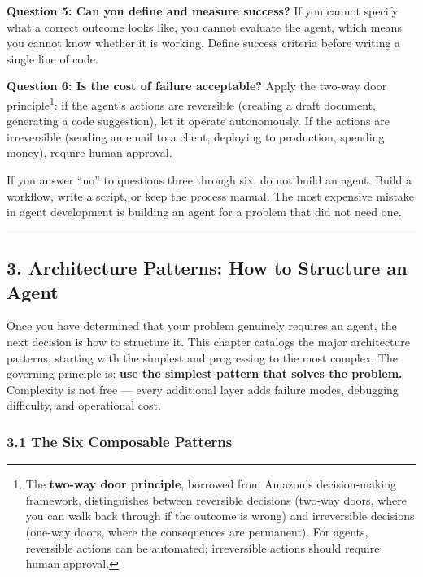 \documentclass[11pt, a4paper]{article}
\begin{document}
\textbf{Question 5: Can you define and measure success?} If you cannot
specify what a correct outcome looks like, you cannot evaluate the
agent, which means you cannot know whether it is working. Define success
criteria before writing a single line of code.

\textbf{Question 6: Is the cost of failure acceptable?} Apply the
two-way door principle\footnote{The \textbf{two-way door principle},
  borrowed from Amazon's decision-making framework, distinguishes
  between reversible decisions (two-way doors, where you can walk back
  through if the outcome is wrong) and irreversible decisions (one-way
  doors, where the consequences are permanent). For agents, reversible
  actions can be automated; irreversible actions should require human
  approval.}: if the agent's actions are reversible (creating a draft
document, generating a code suggestion), let it operate autonomously. If
the actions are irreversible (sending an email to a client, deploying to
production, spending money), require human approval.

If you answer ``no'' to questions three through six, do not build an
agent. Build a workflow, write a script, or keep the process manual. The
most expensive mistake in agent development is building an agent for a
problem that did not need one.

\begin{center}\rule{0.5\linewidth}{0.5pt}\end{center}

\hypertarget{architecture-patterns-how-to-structure-an-agent}{%
\subsection{3. Architecture Patterns: How to Structure an
Agent}\label{architecture-patterns-how-to-structure-an-agent}}

Once you have determined that your problem genuinely requires an agent,
the next decision is how to structure it. This chapter catalogs the
major architecture patterns, starting with the simplest and progressing
to the most complex. The governing principle is: \textbf{use the
simplest pattern that solves the problem.} Complexity is not free ---
every additional layer adds failure modes, debugging difficulty, and
operational cost.

\hypertarget{the-six-composable-patterns}{%
\subsubsection{3.1 The Six Composable
Patterns}\label{the-six-composable-patterns}}
\end{document}
